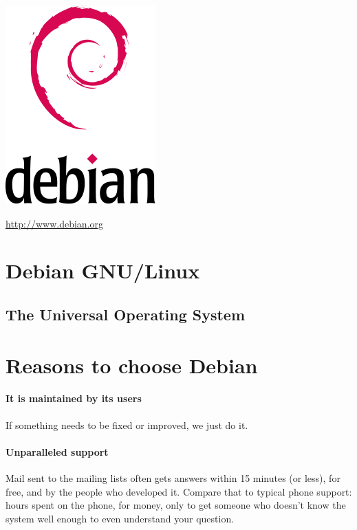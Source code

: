 \documentclass[letterpaper,landscape]{report}
\begin{document}
\begin{multicols}{3}    %

\begin{center}
\noindent
\includegraphics[width=0.5\columnwidth]{openlogo}

\url{http://www.debian.org}
\section*{Debian GNU/Linux}
\subsection*{The Universal Operating System}
\end{center}

\section*{Reasons to choose Debian}
\paragraph{It is maintained by its users}
If something needs to be fixed or improved, we just do it.

\paragraph{Unparalleled support}

Mail sent to the mailing lists often gets answers within 15 minutes (or less),
for free, and by the people who developed it. Compare that to typical phone
support: hours spent on the phone, for money, only to get someone who doesn't
know the system well enough to even understand your question.


\end{multicols}
\end{document}
